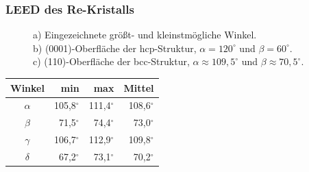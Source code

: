 \documentclass{beamer}
\begin{document}
\begin{frame}
\frametitle{LEED des Re-Kristalls}
\begin{figure}[H]
\begin{minipage}[b]{0.45\textwidth}

\end{minipage}
\begin{minipage}[b]{0.45\textwidth}

\end{minipage}
\caption*{a) Eingezeichnete größt- und
kleinstmögliche Winkel.\\ b) (0001)-Oberfläche der hcp-Struktur, $\alpha=120^{\circ}$ und
$\beta=60^{\circ}$.\\ c) (110)-Oberfläche der bcc-Struktur, $\alpha\approx109{,}5^{\circ}$ und
$\beta\approx70{,}5^{\circ}$.}
\end{figure}
\vspace{-0.5cm}
\small\begin{table}[H]
\centering
\begin{tabular}{ c  r  r  r}
Winkel &	min	 &	max & Mittel \\
 \hline                       
 $\alpha$&105,8$^{\circ}$&111,4$^{\circ}$&108,6$^{\circ}$\\
 $\beta$&71,5$^{\circ}$&74,4$^{\circ}$&73,0$^{\circ}$\\
 $\gamma$&106,7$^{\circ}$&112,9$^{\circ}$&109,8$^{\circ}$\\
 $\delta$&67,2$^{\circ}$&73,1$^{\circ}$&70,2$^{\circ}$\\
\end{tabular}
\end{table}
\end{frame}
\end{document}
